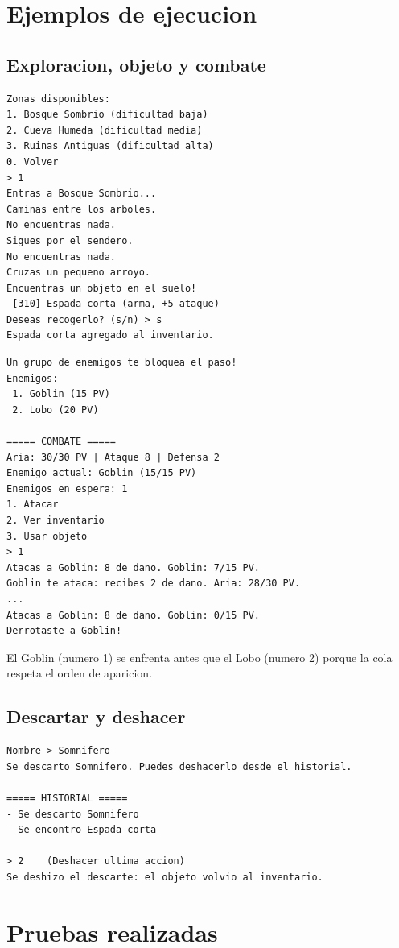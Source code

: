 \documentclass[11pt,a4paper]{article}
\begin{document}
\section{Ejemplos de ejecucion}

\subsection{Exploracion, objeto y combate}
\begin{lstlisting}[language={}]
Zonas disponibles:
1. Bosque Sombrio (dificultad baja)
2. Cueva Humeda (dificultad media)
3. Ruinas Antiguas (dificultad alta)
0. Volver
> 1
Entras a Bosque Sombrio...
Caminas entre los arboles.
No encuentras nada.
Sigues por el sendero.
No encuentras nada.
Cruzas un pequeno arroyo.
Encuentras un objeto en el suelo!
 [310] Espada corta (arma, +5 ataque)
Deseas recogerlo? (s/n) > s
Espada corta agregado al inventario.
\end{lstlisting}

\begin{lstlisting}[language={}]
Un grupo de enemigos te bloquea el paso!
Enemigos:
 1. Goblin (15 PV)
 2. Lobo (20 PV)

===== COMBATE =====
Aria: 30/30 PV | Ataque 8 | Defensa 2
Enemigo actual: Goblin (15/15 PV)
Enemigos en espera: 1
1. Atacar
2. Ver inventario
3. Usar objeto
> 1
Atacas a Goblin: 8 de dano. Goblin: 7/15 PV.
Goblin te ataca: recibes 2 de dano. Aria: 28/30 PV.
...
Atacas a Goblin: 8 de dano. Goblin: 0/15 PV.
Derrotaste a Goblin!
\end{lstlisting}

El Goblin (numero 1) se enfrenta antes que el Lobo (numero 2) porque la cola respeta el orden de aparicion.

\subsection{Descartar y deshacer}
\begin{lstlisting}[language={}]
Nombre > Somnifero
Se descarto Somnifero. Puedes deshacerlo desde el historial.

===== HISTORIAL =====
- Se descarto Somnifero
- Se encontro Espada corta

> 2    (Deshacer ultima accion)
Se deshizo el descarte: el objeto volvio al inventario.
\end{lstlisting}

\section{Pruebas realizadas}
\end{document}
